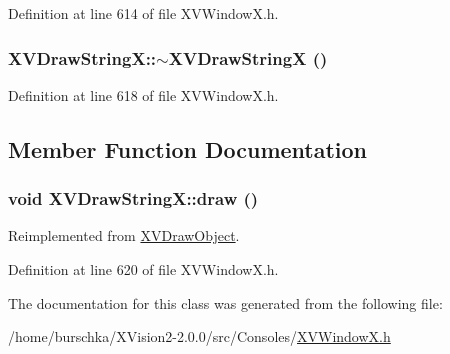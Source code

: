 Definition at line 614 of file XVWindow\-X.h.\label{XVDrawStringX_a1}
\hypertarget{class_XVDrawStringX_a1}{
\subsubsection[~XVDrawStringX]{\setlength{\rightskip}{0pt plus 5cm}XVDraw\-String\-X::$\sim$XVDraw\-String\-X ()}}




Definition at line 618 of file XVWindow\-X.h.

\subsection{Member Function Documentation}
\label{XVDrawStringX_a2}
\hypertarget{class_XVDrawStringX_a2}{
\subsubsection[draw]{\setlength{\rightskip}{0pt plus 5cm}void XVDraw\-String\-X::draw ()}}




Reimplemented from \hyperlink{class_XVDrawObject}{XVDraw\-Object}.

Definition at line 620 of file XVWindow\-X.h.

The documentation for this class was generated from the following file:\begin{CompactItemize}
\item 
/home/burschka/XVision2-2.0.0/src/Consoles/\hyperlink{XVWindowX.h-source}{XVWindow\-X.h}\end{CompactItemize}

